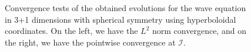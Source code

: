 \begin{figure}[h]
\begin{subfigure}[b]{0.45\textwidth}
    \end{subfigure}
    \caption{Convergence tests of the obtained evolutions for the wave equation in 3+1 dimensions with spherical symmetry using hyperboloidal coordinates. On the left, we have the $L^2$ norm convergence, and on the right, we have the pointwise convergence at $\mathscr{I}$.}
    \label{fig:spherical_compact_wave_equation-2nd_order-convergence}
\end{figure}